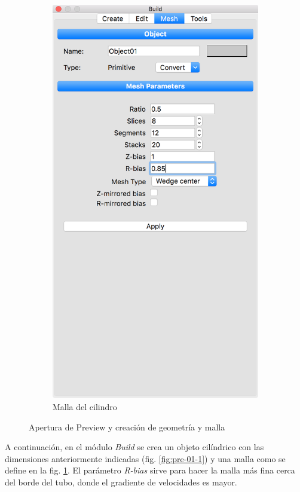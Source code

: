 \begin{figure}[!htp]
\begin{subfigure}[b]{0.30\textwidth}
\includegraphics[width=\linewidth]{figuras_4/01_pre_mesh.png}
\caption{Malla del cilindro}
\label{fig:pre-01-2}
\end{subfigure}
\caption{Apertura de Preview y creación de geometría y malla}
\label{fig:pre-00-01}
\end{figure}
A continuación, en el módulo \emph{Build} se crea un objeto cilíndrico con las dimensiones anteriormente indicadas (fig. \ref{fig:pre-01-1}) y una malla como se define en la fig. \ref{fig:pre-01-2}.
El parámetro \emph{R-bias} sirve para hacer la malla más fina cerca del borde del tubo, donde el gradiente de velocidades es mayor.


